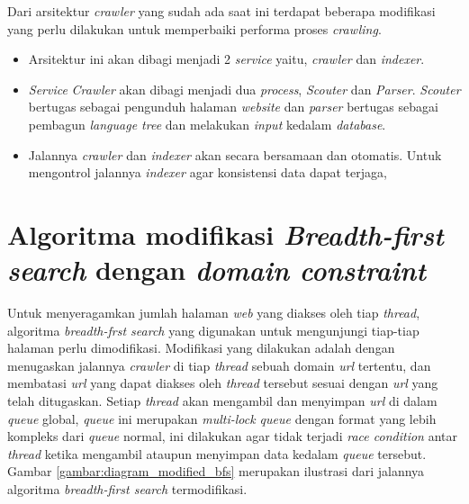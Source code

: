 Dari arsitektur \emph{crawler} yang sudah ada saat ini terdapat beberapa modifikasi yang perlu dilakukan untuk memperbaiki performa proses \emph{crawling}.

\begin{itemize}
  \item Arsitektur ini akan dibagi menjadi 2 \emph{service} yaitu, \emph{crawler} dan \emph{indexer}.
  \item \emph{Service} \emph{Crawler} akan dibagi menjadi dua \emph{process}, \emph{Scouter} dan \emph{Parser}. \emph{Scouter} bertugas sebagai pengunduh halaman \emph{website} dan \emph{parser} bertugas sebagai pembagun \emph{language tree} dan melakukan \emph{input} kedalam \emph{database}.
  \item Jalannya \emph{crawler} dan \emph{indexer} akan secara bersamaan dan otomatis. Untuk mengontrol jalannya \emph{indexer} agar konsistensi data dapat terjaga, 
\end{itemize}

\section{Algoritma modifikasi \emph{Breadth-first search} dengan \emph{domain constraint}}

Untuk menyeragamkan jumlah halaman \emph{web} yang diakses oleh tiap \emph{thread}, algoritma \emph{breadth-frst search} yang digunakan untuk mengunjungi tiap-tiap halaman perlu dimodifikasi. Modifikasi yang dilakukan adalah dengan menugaskan jalannya \emph{crawler} di tiap \emph{thread} sebuah domain \emph{url} tertentu, dan membatasi \emph{url} yang dapat diakses oleh \emph{thread} tersebut sesuai dengan \emph{url} yang telah ditugaskan. Setiap \emph{thread} akan mengambil dan menyimpan \emph{url} di dalam \emph{queue} global, \emph{queue} ini merupakan \emph{multi-lock queue} dengan format yang lebih kompleks dari \emph{queue} normal, ini dilakukan agar tidak terjadi \emph{race condition} antar \emph{thread} ketika mengambil ataupun menyimpan data kedalam \emph{queue} tersebut. Gambar \ref{gambar:diagram_modified_bfs} merupakan ilustrasi dari jalannya algoritma \emph{breadth-first search} termodifikasi.

